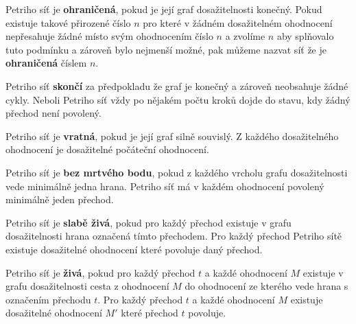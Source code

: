 \documentclass[
  biblatex,
  glossaries,
  printversion
]{kidiplom}
\begin{document}
\begin{definition}
  
  Petriho síť je \textbf{ohraničená}, pokud 
  je její graf dosažitelnosti konečný. Pokud existuje takové přirozené číslo $n$
  pro které v žádném dosažitelném ohodnocení nepřesahuje žádné místo svým ohodnocením 
  číslo $n$ a zvolíme $n$ aby splňovalo tuto podmínku a zároveň bylo 
  nejmenší možné, pak můžeme nazvat síť že je \textbf{ohraničená} číslem $n$.
  
\end{definition}
\begin{definition}\label{def:skončí}
  
  Petriho síť \textbf{skončí} za předpokladu
  že graf je konečný a zároveň neobsahuje žádné cykly.
  Neboli Petriho síť vždy po nějakém počtu kroků dojde do stavu, kdy žádný přechod není povolený.
  
\end{definition}
\begin{definition}
  
  Petriho síť je \textbf{vratná},
  pokud je její graf silně souvislý. Z každého dosažitelného 
  ohodnocení je dosažitelné počáteční ohodnocení.

\end{definition}
\clearpage
\begin{definition}
  
  Petriho síť je \textbf{bez mrtvého bodu},
  pokud z každého vrcholu grafu
  dosažitelnosti vede minimálně jedna hrana.
  Petriho síť má v každém ohodnocení povolený minimálně jeden přechod.

\end{definition}
\begin{definition}
  
  Petriho síť je \textbf{slabě živá}, pokud pro
  každý přechod existuje v grafu dosažitelnosti hrana označená tímto přechodem.
  Pro každý přechod Petriho sítě existuje dosažitelné ohodnocení které 
  povoluje daný přechod.

\end{definition}
\begin{definition}
  
  Petriho síť je \textbf{živá}, pokud 
  pro každý přechod $t$ a každé ohodnocení $M$ existuje v grafu dosažitelnosti cesta
  z ohodnocení $M$ do ohodnocení ze kterého vede hrana s označením přechodu $t$.
  Pro každý přechod $t$ a každé ohodnocení $M$ existuje dosažitelné ohodnocení $M'$ které přechod $t$ povoluje.
  
\end{definition}
  
\end{document}
